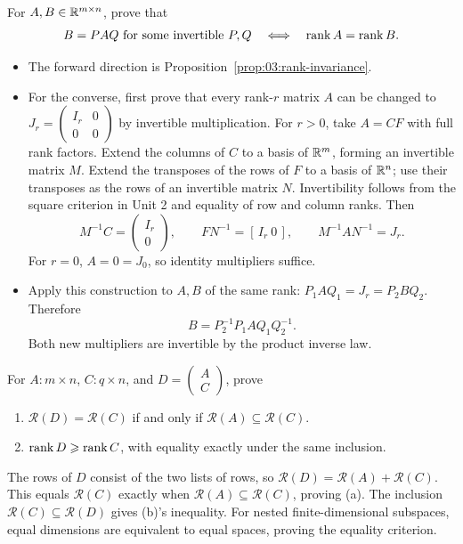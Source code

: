 \begin{problem}\label{ex:03:equivalence}
For \(A,B\in\mathbb R^{m\times n}\), prove that
\[
B=PAQ\text{ for some invertible }P,Q
\quad\Longleftrightarrow\quad\operatorname{rank} A=\operatorname{rank} B.
\]
\end{problem}
\begin{solution}
\begin{itemize}
\item The forward direction is Proposition~\ref{prop:03:rank-invariance}.
\item For the converse, first prove that every rank-\(r\) matrix \(A\) can be
changed to \(J_r=\left(\begin{smallmatrix}I_r&0\\0&0\end{smallmatrix}\right)\)
by invertible multiplication.
For \(r>0\), take \(A=CF\) with full rank factors. Extend the columns
of \(C\) to a basis of \(\mathbb R^m\), forming an invertible matrix \(M\).
Extend the transposes of the rows of \(F\) to a basis of \(\mathbb R^n\);
use their transposes as the rows of an invertible matrix \(N\).
Invertibility follows from the square criterion in Unit 2 and equality
of row and column ranks. Then
\[
M^{-1}C=\begin{pmatrix}I_r\\0\end{pmatrix},\qquad
FN^{-1}=[\,I_r\ 0\,],\qquad M^{-1}AN^{-1}=J_r.
\]
For \(r=0\), \(A=0=J_0\), so identity multipliers suffice.

\item Apply this construction to \(A,B\) of the same rank:
\(P_1AQ_1=J_r=P_2BQ_2\). Therefore
\[
B=P_2^{-1}P_1A Q_1Q_2^{-1}.
\]
Both new multipliers are invertible by the product inverse law.
\end{itemize}
\end{solution}

\begin{problem}\label{ex:03:stacking}
For \(A:m\times n\), \(C:q\times n\), and \(D=\left(\begin{smallmatrix}A\\C\end{smallmatrix}\right)\), prove
\begin{enumerate}
\item \(\mathcal R(D)=\mathcal R(C)\) if and only if \(\mathcal R(A)\subseteq\mathcal R(C)\).
\item \(\operatorname{rank} D\geqslant\operatorname{rank} C\), with equality exactly under the same inclusion.
\end{enumerate}
\end{problem}
\begin{solution}
The rows of \(D\) consist of the two lists of rows, so
\(\mathcal R(D)=\mathcal R(A)+\mathcal R(C)\).
This equals \(\mathcal R(C)\) exactly when \(\mathcal R(A)\subseteq\mathcal R(C)\),
proving (a). The inclusion \(\mathcal R(C)\subseteq\mathcal R(D)\)
gives (b)'s inequality. For nested finite-dimensional subspaces, equal
dimensions are equivalent to equal spaces, proving the equality criterion.
\end{solution}


